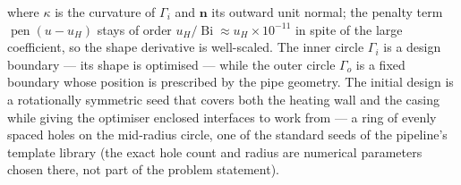\documentclass[preview]{standalone}
\begin{document}
where $\kappa$ is the curvature of $\Gamma_i$ and $\mathbf n$ its outward unit normal; the penalty term $\operatorname{pen}\left(u - u_H\right)$ stays of order $u_H / \operatorname{Bi} \approx u_H \times 10^{-11}$ in spite of the large coefficient, so the shape derivative is well-scaled.  The inner circle $\Gamma_i$ is a design boundary — its shape is optimised — while the outer circle $\Gamma_o$ is a fixed boundary whose position is prescribed by the pipe geometry.
The initial design is a rotationally symmetric seed that covers both the heating wall and the casing while giving the optimiser enclosed interfaces to work from — a ring of evenly spaced holes on the mid-radius circle, one of the standard seeds of the pipeline's template library (the exact hole count and radius are numerical parameters chosen there, not part of the problem statement).
\end{document}
